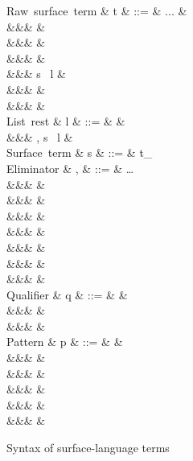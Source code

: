 \begin{figure}[H]
\begin{syntaxfig}
\mbox{Raw surface term}
&
t
&
::=
&
...
&
\\
&&&
&
\\
&&&
&
\\
&&&
\sExNil
&
\\
&&&
\kw{\lbrack}s \ l
&
\\
&&&
&
\\
&&&
&
\\[2mm]

\mbox{List rest}
&
l
&
::=
&
\rbrack
&
\\
&&&
, s \ l
&
\\[2mm]

\mbox{Surface term}
&
s
&
::=
&
t_{\alpha}
\\[2mm]

\mbox{Eliminator}
&
\sigma, \tau
&
::=
&
\ldots
\\
&&&
\elimBoolTrue{\kappa}
&
\\
&&&
\elimBoolFalse{\kappa}
&
\\
&&&
\elimListSingleton{\branchNil{\kappa}}
&
\\
&&&
\elimListSingleton{\branchCons{\sigma}}
&
\\
&&&
\branchEList{\sigma}
&
\\
&&&
\branchNEList{\sigma}
&
\\
&&&
&
\\[2mm]

\mbox{Qualifier}
&
q
&
::=
&
&
\\
&&&
&
\\
&&&
&
\\[2mm]


\mbox{Pattern}
&
p
&
::=
&
&
\\
&&&
\pattNil
&
\\
&&&
&
\\
&&&
\pattSNil
&
\\
&&&
&
\\
&&&
&
\\[2mm]
\end{syntaxfig}
\caption{Syntax of surface-language terms}
\end{figure}
